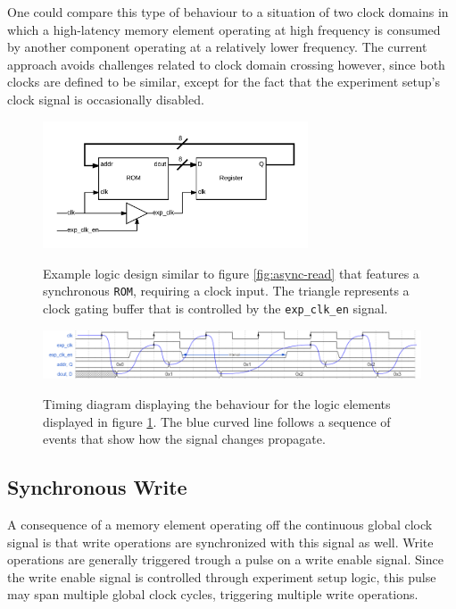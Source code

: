 \documentclass{article}
\begin{document}
One could compare this type of behaviour to a situation of two clock domains in which a high-latency memory element operating at high frequency is consumed by another component operating at a relatively lower frequency. The current approach avoids challenges related to clock domain crossing however, since both clocks are defined to be similar, except for the fact that the experiment setup's clock signal is occasionally disabled. 


\begin{figure}[h!]
    \centering
    \caption{Example logic design similar to figure \ref{fig:async-read} that features a synchronous \texttt{ROM}, requiring a clock input. The triangle represents a clock gating buffer that is controlled by the \texttt{exp\_clk\_en} signal.}
    \includegraphics[width=0.7\textwidth]{img/async-read-rom}
    \label{fig:async-read-rom}
\end{figure}

\begin{figure}[h!]
    \centering
    \caption{Timing diagram displaying the behaviour for the logic elements displayed in figure \ref{fig:async-read-rom}. The blue curved line follows a sequence of events that show how the signal changes propagate.}
    \includegraphics[width=\textwidth]{img/mem-async-exp-clk}
    \label{fig:mem-async-exp-clk}
\end{figure}

\subsection{Synchronous Write}
A consequence of a memory element operating off the continuous global clock signal is that write operations are synchronized with this signal as well. Write operations are generally triggered trough a pulse on a write enable signal. Since the write enable signal is controlled through experiment setup logic, this pulse may span multiple global clock cycles, triggering multiple write operations.  
\end{document}
